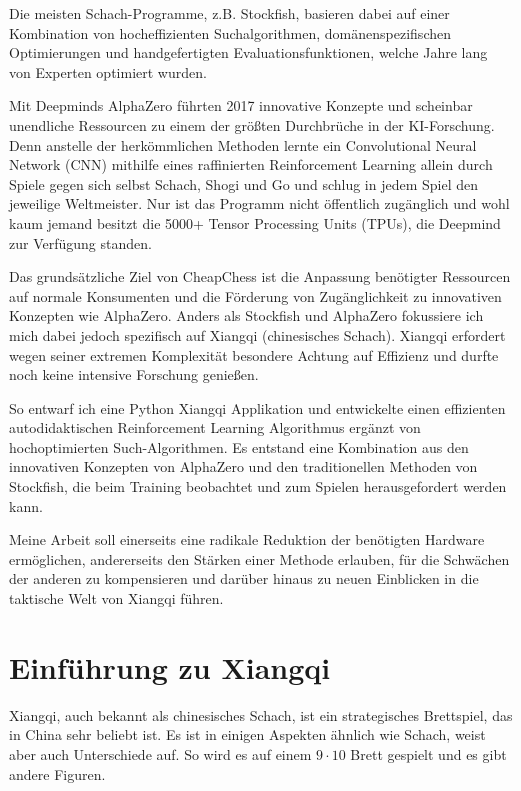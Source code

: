 \documentclass{jpp}
\begin{document}
Die meisten Schach-Programme, z.B. Stockfish, basieren dabei auf einer Kombination von hocheffizienten Suchalgorithmen, domänenspezifischen Optimierungen und handgefertigten Evaluationsfunktionen, welche Jahre lang von Experten optimiert wurden. 

Mit Deepminds AlphaZero führten 2017 innovative Konzepte und scheinbar unendliche Ressourcen zu einem der größten Durchbrüche in der KI-Forschung. Denn anstelle der herkömmlichen Methoden lernte ein Convolutional Neural Network (CNN) mithilfe eines raffinierten Reinforcement Learning allein durch Spiele gegen sich selbst Schach, Shogi und Go und schlug in jedem Spiel den jeweilige Weltmeister. Nur ist das Programm nicht öffentlich zugänglich und wohl kaum jemand besitzt die 5000+ Tensor Processing Units (TPUs), die Deepmind zur Verfügung standen. 

Das grundsätzliche Ziel von CheapChess ist die Anpassung benötigter Ressourcen auf normale Konsumenten und die Förderung von Zugänglichkeit zu innovativen Konzepten wie AlphaZero. Anders als Stockfish und AlphaZero fokussiere ich mich dabei jedoch spezifisch auf Xiangqi (chinesisches Schach). Xiangqi erfordert wegen seiner extremen Komplexität besondere Achtung auf Effizienz und durfte noch keine intensive Forschung genießen.

So entwarf ich eine Python Xiangqi Applikation und entwickelte einen effizienten autodidaktischen Reinforcement Learning Algorithmus ergänzt von hochoptimierten Such-Algorithmen. Es entstand eine Kombination aus den innovativen Konzepten von AlphaZero und den traditionellen Methoden von Stockfish, die beim Training beobachtet und zum Spielen herausgefordert werden kann. 

Meine Arbeit soll einerseits eine radikale Reduktion der benötigten Hardware ermöglichen, andererseits den Stärken einer Methode erlauben, für die Schwächen der anderen zu kompensieren und darüber hinaus zu neuen Einblicken in die taktische Welt von Xiangqi führen.

\section{Einführung zu Xiangqi}
Xiangqi, auch bekannt als chinesisches Schach, ist ein strategisches Brettspiel, das in China sehr beliebt ist. Es ist in einigen Aspekten ähnlich wie Schach, weist aber auch Unterschiede auf. So wird es auf einem $9 \cdot 10$ Brett gespielt und es gibt andere Figuren.
\end{document}
